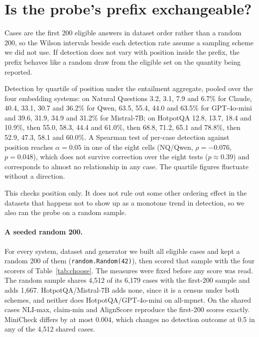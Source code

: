 \documentclass[11pt]{article}
\begin{document}
\section{Is the probe's prefix exchangeable?}
\label{app:prefix}

Cases are the first 200 eligible answers in dataset order rather than a random 200, so the Wilson intervals beside each detection rate assume a sampling scheme we did not use. If detection does not vary with position inside the prefix, the prefix behaves like a random draw from the eligible set on the quantity being reported.

Detection by quartile of position under the entailment aggregate, pooled over the four embedding systems: on Natural Questions 3.2, 3.1, 7.9 and 6.7\% for Claude, 40.4, 33.1, 30.7 and 36.2\% for Qwen, 63.5, 55.4, 44.0 and 63.5\% for GPT-4o-mini and 39.6, 31.9, 34.9 and 31.2\% for Mistral-7B; on HotpotQA 12.8, 13.7, 18.4 and 10.9\%, then 55.0, 58.3, 44.4 and 61.0\%, then 68.8, 71.2, 65.1 and 78.8\%, then 52.9, 47.3, 58.1 and 60.0\%. A Spearman test of per-case detection against position reaches $\alpha = 0.05$ in one of the eight cells (NQ/Qwen, $\rho = -0.076$, $p = 0.048$), which does not survive correction over the eight tests ($p \approx 0.39$) and corresponds to almost no relationship in any case. The quartile figures fluctuate without a direction.

This checks position only. It does not rule out some other ordering effect in the datasets that happens not to show up as a monotone trend in detection, so we also ran the probe on a random sample.

\paragraph{A seeded random 200.} For every system, dataset and generator we built all eligible cases and kept a random 200 of them (\texttt{random.Random(42)}), then scored that sample with the four scorers of Table~\ref{tab:choose}. The measures were fixed before any score was read. The random sample shares 4,512 of its 6,179 cases with the first-200 sample and adds 1,667. HotpotQA/Mistral-7B adds none, since it is a census under both schemes, and neither does HotpotQA/GPT-4o-mini on all-mpnet. On the shared cases NLI-max, claim-min and AlignScore reproduce the first-200 scores exactly. MiniCheck differs by at most 0.004, which changes no detection outcome at 0.5 in any of the 4,512 shared cases.
\end{document}
